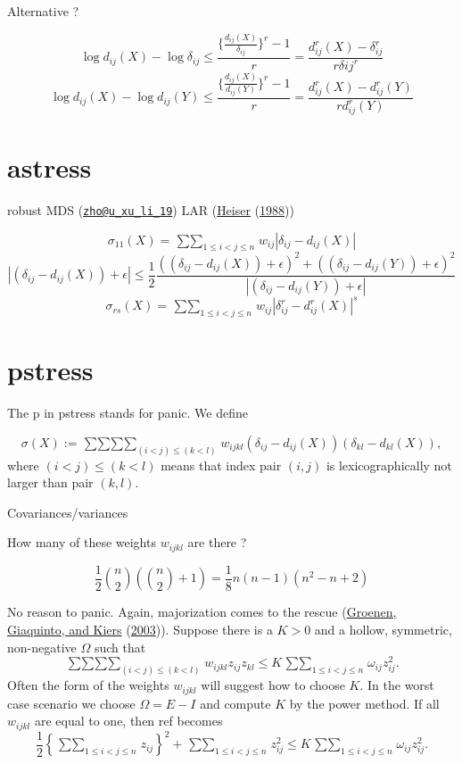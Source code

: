 \documentclass[
  12pt,
]{book}
\theoremstyle{definition}
\theoremstyle{definition}
\theoremstyle{definition}
\theoremstyle{definition}
\theoremstyle{remark}
\begin{document}
Alternative ?

\[
\log d_{ij}(X)-\log \delta_{ij}\leq \frac{\{\frac{d_{ij}(X)}{\delta_{ij}}\}^r-1}{r}=\frac{d_{ij}^r(X)-\delta_{ij}^r}{r\delta{ij}^r}
\]
\[
\log d_{ij}(X)-\log d_{ij}(Y)\leq \frac{\{\frac{d_{ij}(X)}{d_{ij}(Y)}\}^r-1}{r}=\frac{d_{ij}^r(X)-d_{ij}^r(Y)}{rd_{ij}^r(Y)}
\]

\hypertarget{astress}{%
\section{astress}\label{astress}}

robust MDS (\href{mailto:zho@u_xu_li_19}{\nolinkurl{zho@u\_xu\_li\_19}})
LAR (\protect\hyperlink{ref-heiser_88}{Heiser} (\protect\hyperlink{ref-heiser_88}{1988}))

\[
\sigma_{11}(X)=\mathop{\sum\sum}_{1\leq i<j\leq n}w_{ij}|\delta_{ij}-d_{ij}(X)|
\]
\[
|(\delta_{ij}-d_{ij}(X))+\epsilon|\leq\frac12\frac{((\delta_{ij}-d_{ij}(X))+\epsilon)^2+((\delta_{ij}-d_{ij}(Y))+\epsilon)^2}{|(\delta_{ij}-d_{ij}(Y))+\epsilon|}
\]
\[
\sigma_{rs}(X)=\mathop{\sum\sum}_{1\leq i<j\leq n}w_{ij}|\delta_{ij}^r-d_{ij}^r(X)|^s
\]

\hypertarget{pstress}{%
\section{pstress}\label{pstress}}

The p in pstress stands for panic. We define

\[
\sigma(X):=\mathop{\sum\sum\sum\sum}_{(i<j)\leq(k<l)} w_{ijkl}(\delta_{ij}-d_{ij}(X))(\delta_{kl}-d_{kl}(X)),
\]
where \((i<j)\leq(k<l)\) means that index pair \((i,j)\) is lexicographically not larger than pair \((k,l)\).

Covariances/variances

How many of these weights \(w_{ijkl}\) are there ?

\[
\frac12\binom{n}{2}(\binom{n}{2}+1)=\frac18 n(n-1)(n^2-n+2)
\]

No reason to panic. Again, majorization comes to the rescue (\protect\hyperlink{ref-groenen_giaquinto_kiers_03}{Groenen, Giaquinto, and Kiers} (\protect\hyperlink{ref-groenen_giaquinto_kiers_03}{2003})). Suppose there is a \(K>0\) and a hollow, symmetric, non-negative \(\Omega\) such that
\[
\mathop{\sum\sum\sum\sum}_{(i<j)\leq(k<l)} w_{ijkl}z_{ij}z_{kl}\leq K\mathop{\sum\sum}_{1\leq i<j\leq n}\omega_{ij}z_{ij}^2.
\]
Often the form of the weights \(w_{ijkl}\) will suggest how to choose \(K\). In the worst case scenario we choose \(\Omega=E-I\) and compute \(K\) by the power method.
If all \(w_{ijkl}\) are equal to one, then ref becomes
\[
\frac12\left\{\mathop{\sum\sum}_{1\leq i<j\leq n}z_{ij}\right\}^2+
\mathop{\sum\sum}_{1\leq i<j\leq n}z_{ij}^2\leq K\mathop{\sum\sum}_{1\leq i<j\leq n}\omega_{ij}z_{ij}^2.
\]
\end{document}
